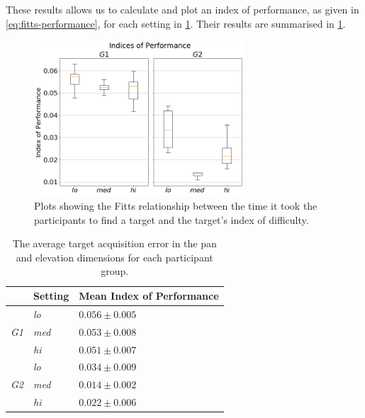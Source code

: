 \documentclass{article}
\begin{document}
These results allows us to calculate and plot an index of performance, as given in \cref{eq:fitts-performance}, for each setting in \cref{fig:fitts-ips}.
Their results are summarised in \cref{tab:fitts-results}.

\begin{figure}
  \centering
  \includegraphics[width=0.7\textwidth]{figures/fitts_ips.png}
  \caption{Plots showing the Fitts relationship between the time it took the participants to find a target and the target's index of difficulty. }\label{fig:fitts-ips}
\end{figure}

\begin{table}
  \centering
  \caption{The average target acquisition error in the pan and elevation dimensions for each participant group. }\label{tab:fitts-results}
  \begin{tabular}{p{0.5cm}p{1.2cm}p{2.3cm}}
    \toprule
    & Setting      & Mean Index of Performance \\ \midrule
    & \textit{lo}  & $0.056\pm0.005$ \\
    \textit{G1} & \textit{med} & $0.053\pm0.008$ \\
		& \textit{hi}  & $0.051\pm0.007$ \\ \cline{2-3}
    & \textit{lo}  & $0.034\pm0.009$ \\
    \textit{G2} & \textit{med} & $0.014\pm0.002$ \\
    & \textit{hi}  & $0.022\pm0.006$ \\
    \bottomrule
  \end{tabular}
\end{table}
\end{document}
